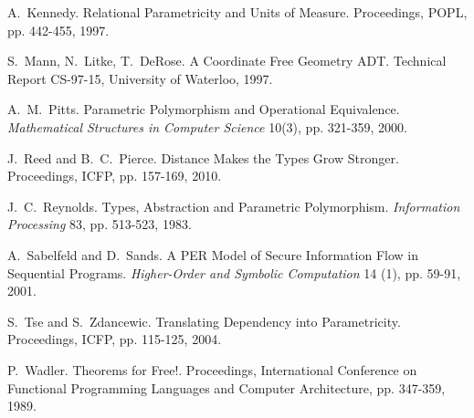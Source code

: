 \documentclass[preprint]{sigplanconf}
\theoremstyle{examplestyle}
\theoremstyle{restatementstyle}
\begin{document}
\begin{thebibliography}{12}
A.~Kennedy. Relational Parametricity and Units of Measure.
Proceedings, POPL, pp. 442-455, 1997.

S.~Mann, N.~Litke, T.~DeRose.  A Coordinate Free Geometry {ADT}.
Technical Report CS-97-15, University of Waterloo, 1997.

A.~M.~Pitts.  Parametric Polymorphism and Operational Equivalence.
{\em Mathematical Structures in Computer Science} 10(3), pp. 321-359,
2000.

J.~Reed and B.~C.~Pierce.  Distance Makes the Types Grow Stronger.
Proceedings, ICFP, pp. 157-169, 2010.

J.~C.~Reynolds. Types, Abstraction and Parametric Polymorphism.
{\em Information Processing} 83, pp. 513-523, 1983.

A.~Sabelfeld and D.~Sands.  A PER Model of Secure Information Flow in
Sequential Programs.  {\em Higher-Order and Symbolic Computation} 14
(1), pp. 59-91, 2001.

S.~Tse and S.~Zdancewic.  Translating Dependency into Parametricity.
Proceedings, ICFP,  pp.
115-125, 2004.

P.~Wadler.  Theorems for Free!.  Proceedings, International Conference
on Functional Programming Languages and Computer Architecture,
pp. 347-359, 1989.

\end{thebibliography}

%
%


% 
\end{document}
